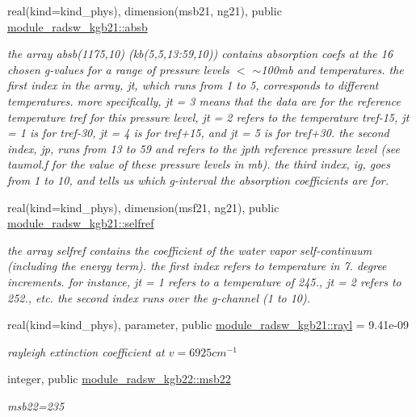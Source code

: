 \begin{Indent}
\begin{DoxyCompactItemize}
real(kind=kind\+\_\+phys), dimension(msb21, ng21), public \hyperlink{group__module__radsw__kgbnn_ga1d3f12f050c90be49f109205c463b29b}{module\+\_\+radsw\+\_\+kgb21\+::absb}
\begin{DoxyCompactList}\small\item\em the array absb(1175,10) (kb(5,5,13\+:59,10)) contains absorption coefs at the 16 chosen g-\/values for a range of pressure levels $<$ $\sim$100mb and temperatures. the first index in the array, jt, which runs from 1 to 5, corresponds to different temperatures. more specifically, jt = 3 means that the data are for the reference temperature tref for this pressure level, jt = 2 refers to the temperature tref-\/15, jt = 1 is for tref-\/30, jt = 4 is for tref+15, and jt = 5 is for tref+30. the second index, jp, runs from 13 to 59 and refers to the jpth reference pressure level (see taumol.\+f for the value of these pressure levels in mb). the third index, ig, goes from 1 to 10, and tells us which g-\/interval the absorption coefficients are for. \end{DoxyCompactList}\item 
real(kind=kind\+\_\+phys), dimension(msf21, ng21), public \hyperlink{group__module__radsw__kgbnn_ga76fc3e4566fcee982b99b10ea562ba93}{module\+\_\+radsw\+\_\+kgb21\+::selfref}
\begin{DoxyCompactList}\small\item\em the array selfref contains the coefficient of the water vapor self-\/continuum (including the energy term). the first index refers to temperature in 7. degree increments. for instance, jt = 1 refers to a temperature of 245., jt = 2 refers to 252., etc. the second index runs over the g-\/channel (1 to 10). \end{DoxyCompactList}\item 
real(kind=kind\+\_\+phys), parameter, public \hyperlink{group__module__radsw__kgbnn_ga8df418599fb8aef5fc8f2935a913b361}{module\+\_\+radsw\+\_\+kgb21\+::rayl} = 9.\+41e-\/09
\begin{DoxyCompactList}\small\item\em rayleigh extinction coefficient at $v=6925cm^{-1}$ \end{DoxyCompactList}\item 
integer, public \hyperlink{group__module__radsw__kgbnn_ga3398f8d12ec0349b44197873ac58fd98}{module\+\_\+radsw\+\_\+kgb22\+::msb22}
\begin{DoxyCompactList}\small\item\em msb22=235 \end{DoxyCompactList}\item 

\end{DoxyCompactItemize}
\end{Indent}
